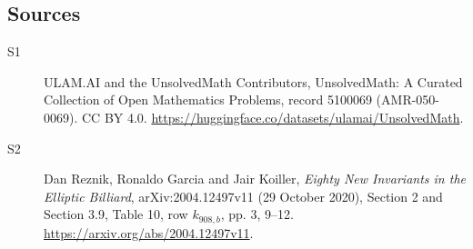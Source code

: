 \documentclass[11pt]{article}
\begin{document}
\subsection{Sources}
\begin{description}
\item[\hypertarget{source:5100069:1}{S1}] ULAM.AI and the UnsolvedMath Contributors, UnsolvedMath: A Curated Collection of Open Mathematics Problems, record 5100069 (AMR-050-0069). CC BY 4.0. \url{https://huggingface.co/datasets/ulamai/UnsolvedMath}.
\item[\hypertarget{source:5100069:2}{S2}] Dan Reznik, Ronaldo Garcia and Jair Koiller, \emph{Eighty New Invariants in the Elliptic Billiard}, arXiv:2004.12497v11 (29 October 2020), Section 2 and Section 3.9, Table 10, row $k_{908,b}$, pp. 3, 9--12. \url{https://arxiv.org/abs/2004.12497v11}.
\end{description}
\label{end:5100069}
\end{document}
